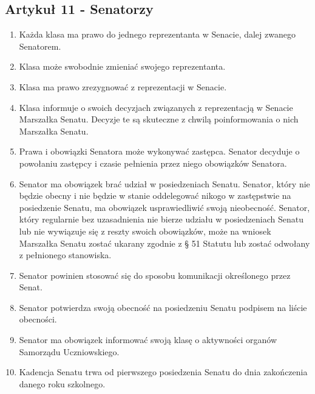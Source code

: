 \documentclass[14pt]{article}
\newenvironment{ustepy}{%
	\begin{enumerate}[leftmargin=1.5em, itemindent=1pt, labelwidth=1em, itemsep=5pt]
	}{%
	\end{enumerate}
}
\begin{document}
\subsection*{Artykuł 11 - Senatorzy}
\begin{ustepy}
	\item Każda klasa ma prawo do jednego reprezentanta w Senacie, dalej zwanego Senatorem.
	\item Klasa może swobodnie zmieniać swojego reprezentanta.
	\item Klasa ma prawo zrezygnować z reprezentacji w Senacie.
	\item Klasa informuje o swoich decyzjach związanych z reprezentacją w Senacie Marszałka Senatu. Decyzje te są skuteczne z chwilą poinformowania o nich Marszałka Senatu.
	\item Prawa i obowiązki Senatora może wykonywać zastępca. Senator decyduje o powołaniu zastępcy i czasie pełnienia przez niego obowiązków Senatora.
	\item Senator ma obowiązek brać udział w posiedzeniach Senatu. Senator, który nie będzie obecny i nie będzie w stanie oddelegować nikogo w zastępstwie na posiedzenie Senatu, ma obowiązek usprawiedliwić swoją nieobecność. Senator, który regularnie bez uzasadnienia nie bierze udziału w posiedzeniach Senatu lub nie wywiązuje się z reszty swoich obowiązków, może na wniosek Marszałka Senatu zostać ukarany zgodnie z § 51 Statutu lub zostać odwołany z pełnionego stanowiska.
	\item Senator powinien stosować się do sposobu komunikacji określonego przez Senat. 
	\item Senator potwierdza swoją obecność na posiedzeniu Senatu podpisem na liście obecności.
	\item Senator ma obowiązek informować swoją klasę o aktywności organów Samorządu Uczniowskiego.
	\item Kadencja Senatu trwa od pierwszego posiedzenia Senatu do dnia zakończenia danego roku szkolnego.
\end{ustepy}
\end{document}
